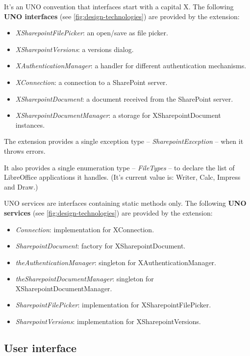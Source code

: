 It's an UNO convention that interfaces start with a capital X. The following
\textbf{UNO interfaces} (see \autoref{fig:design-technologies}) are provided by the
extension:

\begin{itemize}
\item \emph{XSharepointFilePicker}: an open/save as file picker.
\item \emph{XSharepointVersions}: a versions dialog.
\item \emph{XAuthenticationManager}: a handler for different authentication mechanisms.
\item \emph{XConnection}: a connection to a SharePoint server.
\item \emph{XSharepointDocument}: a document received from the
SharePoint server.
\item \emph{XSharepointDocumentManager}: a storage for XSharepointDocument instances.
\end{itemize}

The extension provides a single exception type -- \emph{SharepointException} --
when it throws errors.

It also provides a single enumeration type -- \emph{FileTypes} -- to declare
the list of LibreOffice applications it handles. (It's current value is:
Writer, Calc, Impress and Draw.)

UNO services are interfaces containing static methods only.  The following
\textbf{UNO services} (see \autoref{fig:design-technologies}) are provided by the
extension:

\begin{itemize}
\item \emph{Connection}: implementation for XConnection.
\item \emph{SharepointDocument}: factory for XSharepointDocument.
\item \emph{theAuthenticationManager}: singleton for XAuthenticationManager.
\item \emph{theSharepointDocumentManager}: singleton for XSharepointDocumentManager.
\item \emph{SharepointFilePicker}: implementation for XSharepointFilePicker.
\item \emph{SharepointVersions}: implementation for XSharepointVersions.
\end{itemize}

\subsection{User interface}

